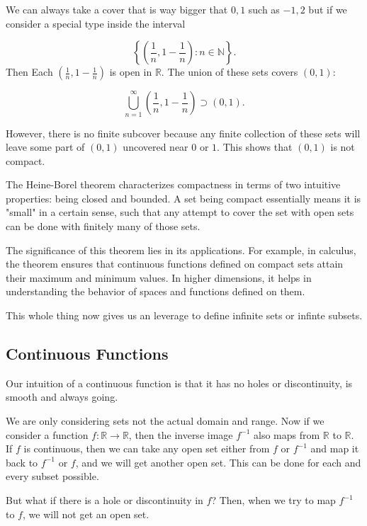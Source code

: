 \documentclass{article}
\begin{document}
We can always take a cover that is way bigger that \( 0, 1 \) such as \( -1, 2 \) but if we consider a special type inside the interval 

\[
\left\{ \left(\frac{1}{n}, 1 - \frac{1}{n}\right) : n \in \mathbb{N} \right\}.
\]
Then Each \(\left(\frac{1}{n}, 1 - \frac{1}{n}\right)\) is open in \(\mathbb{R}\). The union of these sets covers \((0, 1)\):

\[
\bigcup_{n=1}^{\infty} \left(\frac{1}{n}, 1 - \frac{1}{n}\right) \supset (0, 1).
\]

However, there is no finite subcover because any finite collection of these sets will leave some part of \((0, 1)\) uncovered near \(0\) or \(1\). This shows that \((0, 1)\) is not compact.

The Heine-Borel theorem characterizes compactness in terms of two intuitive properties: being closed and bounded. A set being compact essentially means it is "small" in a certain sense, such that any attempt to cover the set with open sets can be done with finitely many of those sets.

The significance of this theorem lies in its applications. For example, in calculus, the theorem ensures that continuous functions defined on compact sets attain their maximum and minimum values. In higher dimensions, it helps in understanding the behavior of spaces and functions defined on them.

This whole thing now gives us an leverage to define infinite sets or infinte subsets.  

\subsection{Continuous Functions} 

Our intuition of a continuous function is that it has no holes or discontinuity, is smooth and always going. 

We are only considering sets not the actual domain and range. Now if we consider a function \( f: \mathbb{R} \to \mathbb{R} \), then the inverse image \( f^{-1} \) also maps from \(\mathbb{R}\) to \(\mathbb{R}\). If \( f \) is continuous, then we can take any open set either from \( f \) or \( f^{-1} \) and map it back to \( f^{-1} \) or \( f \), and we will get another open set. This can be done for each and every subset possible.

But what if there is a hole or discontinuity in \( f \)? Then, when we try to map \( f^{-1} \) to \( f \), we will not get an open set.
\end{document}
